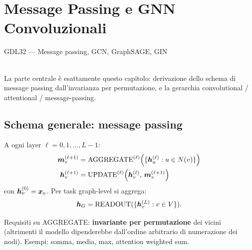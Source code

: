 \chapter{Message Passing e GNN Convoluzionali}
\label{ch:gnn-mp}

\begin{risorsevideo}{GDL32 — Message passing, GCN, GraphSAGE, GIN}

\medskip
{}\\
La parte centrale è esattamente questo capitolo: derivazione dello schema di message passing dall'invarianza per permutazione, e la gerarchia convolutional / attentional / message-passing.
\end{risorsevideo}

\section{Schema generale: message passing}

\begin{definition}
A ogni layer $\ell = 0, 1, \dots, L-1$:
\begin{align}
\bm{m}_v^{(\ell+1)} &= \mathrm{AGGREGATE}^{(\ell)}\!\left(\{\bm{h}_u^{(\ell)} : u \in N(v)\}\right) \label{eq:mp-agg}\\
\bm{h}_v^{(\ell+1)} &= \mathrm{UPDATE}^{(\ell)}\!\left(\bm{h}_v^{(\ell)},\, \bm{m}_v^{(\ell+1)}\right) \label{eq:mp-upd}
\end{align}
con $\bm{h}_v^{(0)} = \bm{x}_v$. Per task graph-level si aggrega:
\[
\bm{h}_G = \mathrm{READOUT}(\{\bm{h}_v^{(L)} : v \in V\}).
\]
\end{definition}

Requisiti su AGGREGATE: \textbf{invariante per permutazione} dei vicini (altrimenti il modello dipenderebbe dall'ordine arbitrario di numerazione dei nodi). Esempi: somma, media, max, attention weighted sum.

